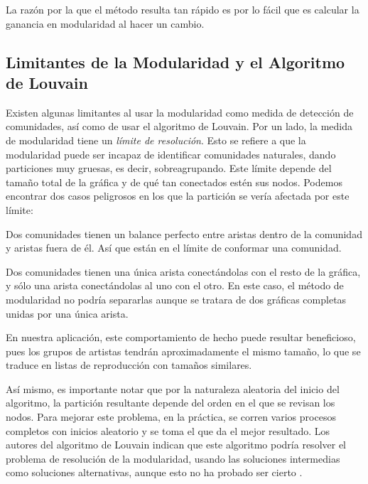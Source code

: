\documentclass[conference]{IEEEtran}
\begin{document}
La razón por la que el método resulta tan rápido es por lo fácil que es calcular la ganancia en modularidad al hacer un cambio. 

\subsection{Limitantes de la Modularidad y el Algoritmo de Louvain}

Existen algunas limitantes al usar la modularidad como medida de detección de comunidades, así como de usar el algoritmo de Louvain. Por un lado, la medida de modularidad tiene un \textit{límite de resolución}. Esto se refiere a que la modularidad puede ser incapaz de identificar comunidades naturales, dando particiones muy gruesas, es decir, sobreagrupando. Este límite depende del tamaño total de la gráfica y de qué tan conectados estén sus nodos. Podemos encontrar dos casos peligrosos en los que la partición se vería afectada por este límite:
\begin{compactenum}
    \item Dos comunidades tienen un balance perfecto entre aristas dentro de la comunidad y aristas fuera de él. Así que están en el límite de conformar una comunidad.
    \item Dos comunidades tienen una única arista conectándolas con el resto de la gráfica, y sólo una arista conectándolas al uno con el otro. En este caso, el método de modularidad no podría separarlas aunque se tratara de dos gráficas completas unidas por una única arista.
\end{compactenum}

En nuestra aplicación, este comportamiento de hecho puede resultar beneficioso, pues los grupos de artistas tendrán aproximadamente el mismo tamaño, lo que se traduce en listas de reproducción con tamaños similares.


Así mismo, es importante notar que por la naturaleza aleatoria del inicio del algoritmo, la partición resultante depende del orden en el que se revisan los nodos. Para mejorar este problema, en la práctica, se corren varios procesos completos con inicios aleatorio y se toma el que da el mejor resultado. Los autores del algoritmo de Louvain indican que este algoritmo podría resolver el problema de resolución de la modularidad, usando las soluciones intermedias como soluciones alternativas, aunque esto no ha probado ser cierto \cite{Fortunato201075}.
\end{document}
